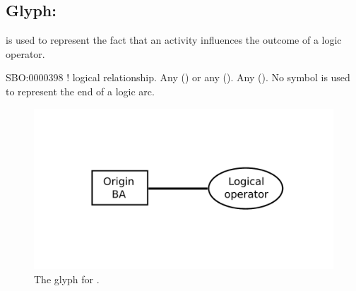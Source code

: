 
\subsection{Glyph:  }\label{sec:af:logicArc}

 is used to represent the fact that an activity influences the outcome of a logic operator.

\begin{glyphDescription}
 \glyphSboTerm SBO:0000398 ! logical relationship.
 \glyphOrigin Any  () or any  ().
 \glyphTarget Any  ().
 \glyphEndPoint No symbol is used to represent the end of a logic arc.
 \end{glyphDescription}

\begin{figure}[H]
  \centering
  \includegraphics[scale = 0.4]{images/build/logicArc.pdf}
  \caption{The \AF glyph for .}
  \label{fig:logicArc}
\end{figure}
